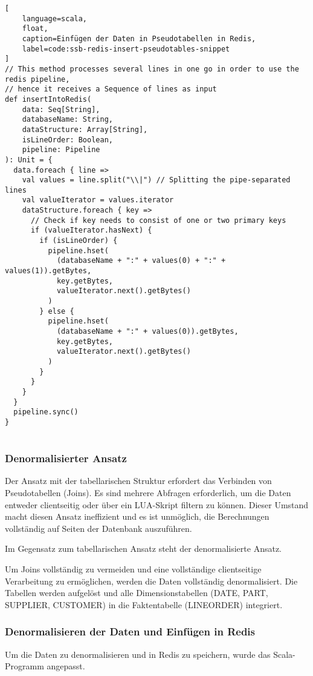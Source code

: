 \begin{lstlisting}[
    language=scala,
    float,
    caption=Einfügen der Daten in Pseudotabellen in Redis,
    label=code:ssb-redis-insert-pseudotables-snippet
]
// This method processes several lines in one go in order to use the redis pipeline,
// hence it receives a Sequence of lines as input
def insertIntoRedis(
    data: Seq[String],
    databaseName: String,
    dataStructure: Array[String],
    isLineOrder: Boolean,
    pipeline: Pipeline
): Unit = {
  data.foreach { line =>
    val values = line.split("\\|") // Splitting the pipe-separated lines
    val valueIterator = values.iterator
    dataStructure.foreach { key =>
      // Check if key needs to consist of one or two primary keys
      if (valueIterator.hasNext) {
        if (isLineOrder) {
          pipeline.hset(
            (databaseName + ":" + values(0) + ":" + values(1)).getBytes,
            key.getBytes,
            valueIterator.next().getBytes()
          )
        } else {
          pipeline.hset(
            (databaseName + ":" + values(0)).getBytes,
            key.getBytes,
            valueIterator.next().getBytes()
          )
        }
      }
    }
  }
  pipeline.sync()
}


\end{lstlisting}

\subsubsection{Denormalisierter Ansatz}
Der Ansatz mit der tabellarischen Struktur erfordert das Verbinden von Pseudotabellen (Joins).
Es sind mehrere Abfragen erforderlich, um die Daten entweder clientseitig oder über ein LUA-Skript filtern zu können.
Dieser Umstand macht diesen Ansatz ineffizient und es ist unmöglich, die Berechnungen vollständig auf Seiten der Datenbank auszuführen.

Im Gegensatz zum tabellarischen Ansatz steht der denormalisierte Ansatz.

Um Joins vollständig zu vermeiden und eine vollständige clientseitige Verarbeitung zu ermöglichen, werden die Daten vollständig denormalisiert.
Die Tabellen werden aufgelöst
und alle Dimensionstabellen (DATE, PART, SUPPLIER, CUSTOMER) in die Faktentabelle (LINEORDER) integriert.

\subsubsection{Denormalisieren der Daten und Einfügen in Redis}
Um die Daten zu denormalisieren und in Redis zu speichern, wurde das Scala-Programm angepasst.

